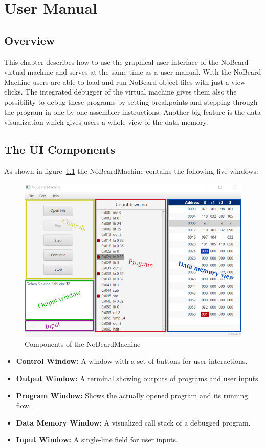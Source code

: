 \chapter{User Manual}
\lstset{language=NoBeardAsm}
\section{Overview}
This chapter describes how to use the graphical user interface of the NoBeard virtual machine and serves at the same time as a user manual. With the NoBeard Machine users are able to load and run NoBeard object files with just a view clicks. The integrated debugger of the virtual machine gives them also the possibility to debug these programs by setting breakpoints and stepping through the program in one by one assembler instructions. Another big feature is the data visualization which gives users a whole view of the data memory.
\section{The UI Components}
As shown in figure~\ref{fig:components} the NoBeardMachine contains the following five windows:

\begin{figure}[h] 
	\centering
	\includegraphics[scale=.87]{images/screenshot-0.png}
	\caption{Components of the NoBeardMachine}
	\label{fig:components}
\end{figure}

\begin{itemize}
\item \textbf{Control Window: }A window with a set of buttons for user interactions.
\item \textbf{Output Window: }A terminal showing outputs of programs and user inputs.
\item \textbf{Program Window: }Shows the actually opened program and its running flow.
\item \textbf{Data Memory Window: }A visualized call stack of a debugged program.
\item \textbf{Input Window: }A single-line field for user inputs.
\end{itemize}

